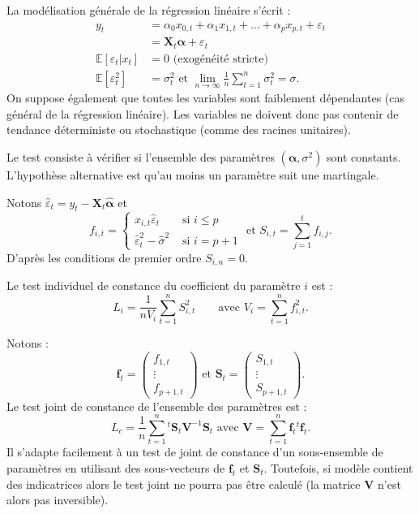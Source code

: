 \documentclass[
  a4paper,
  DIV=11,
  numbers=noendperiod,
  french]{scrartcl}
\newcommand\1{{\mathds 1}}
\newcommand{\transp}[1]{{}^t\!#1}
\newcommand{\bf}[1]{{\boldsymbol #1}}
\newcommand{\E}[1]{\mathbb{E}\left[#1\right]}
\theoremstyle{remark}
\begin{document}
La modélisation générale de la régression linéaire s'écrit :
\begin{align*}
y_t&=\alpha_{0}x_{0,t}+\alpha_{1} x_{1,t}+\dots+\alpha_{p} x_{p,t} +\varepsilon_t  \\
&= {\bf X_t} \bf\alpha  +\varepsilon_t\\
\E{\varepsilon_t|x_t}&=0 \text{ (exogénéité stricte)} \\
\E{\varepsilon_t^2}&=\sigma_t^2\text{ et } \underset{n\to\infty}{\lim}\frac{1}{n}\sum_{t=1}^n\sigma_t^2=\sigma.
\end{align*} On suppose également que toutes les variables sont
faiblement dépendantes (cas général de la régression linéaire). Les
variables ne doivent donc pas contenir de tendance déterministe ou
stochastique (comme des racines unitaires).

Le test consiste à vérifier si l'ensemble des paramètres
\((\bf \alpha,\sigma^2)\) sont constants. L'hypothèse alternative est
qu'au moins un paramètre suit une martingale.

Notons \({\hat \varepsilon}_t =y_t- {\bf X_t} \hat{\bf\alpha}\) et \[
f_{i,t} = \begin{cases}
x_{i,t}\hat \varepsilon_t &\text{ si }i\leq p\\
\hat \varepsilon_t^2 - \hat \sigma^2&\text{ si }i=p+1
\end{cases}
\text{ et }S_{i,t} = \sum_{j=1}^tf_{i,j}.
\] D'après les conditions de premier ordre \(S_{i,n}=0.\)

Le test individuel de constance du coefficient du paramètre \(i\) est :
\[
L_i=\frac{1}{nV_i}\sum_{t=1}^nS_{i,t}^2\qquad
\text{avec }V_i=\sum_{t=1}^nf_{i,t}^2.
\]

Notons : \[
\bf f_t= \begin{pmatrix}
f_{1,t} \\ \vdots \\ f_{p+1,t}
\end{pmatrix} \text{ et }
\bf S_t= \begin{pmatrix}
S_{1,t} \\ \vdots \\ S_{p+1,t}
\end{pmatrix}.
\] Le test joint de constance de l'ensemble des paramètres est : \[
L_c = \frac{1}{n}
\sum_{t=1}^n\transp{\bf S_t}\bf V^{-1}\bf S_t
\text{ avec }\bf V=\sum_{t=1}^n\bf f_{t}\transp{\bf f_{t}}.
\] Il s'adapte facilement à un test de joint de constance d'un
sous-ensemble de paramètres en utilisant des sous-vecteurs de
\(\bf f_t\) et \(\bf S_t.\) Toutefois, si modèle contient des
indicatrices alors le test joint ne pourra pas être calculé (la matrice
\(\bf V\) n'est alors pas inversible).
\end{document}
